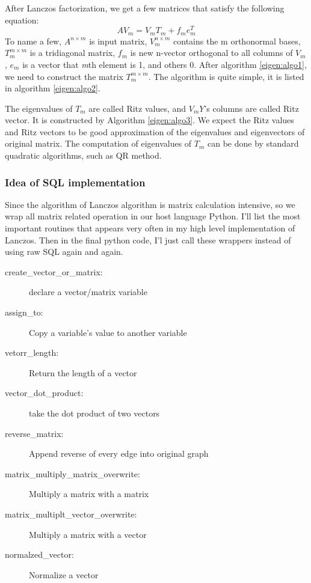 After Lanczos factorization, we get a few matrices that satisfy the following equation:
\begin{equation}
	AV_{m} = V_{m}T_{m} + f_{m}e^{T}_{m}
\end{equation}
To name a few, $A^{n\times m}$ is input matrix, $V^{n\times m}_{m}$ contains the m orthonormal bases, $T^{m\times m}_{m}$ is a tridiagonal matrix, $f_{m}$ is new n-vector orthogonal to all columns of $V_{m}$, $
e_{m}$ is a vector that \emph{m}th element is 1, and others 0. After algorithm \ref{eigen:algo1}, we need to construct the matrix $T^{m\times m}_{m}$. The algorithm is quite simple, it is listed in algorithm \ref{eigen:algo2}. 

The eigenvalues of $T_{m}$ are called Ritz values, and $V_{m}Y$'s columns are called Ritz vector. It is constructed by Algorithm \ref{eigen:algo3}. We expect the Ritz values and Ritz vectors to be good approximation of the eigenvalues and eigenvectors of original matrix. The computation of eigenvalues of $T_{m}$ can be done by standard quadratic algorithms, such as QR method. 


\subsubsection{Idea of SQL implementation}
Since the algorithm of Lanczos algorithm is matrix calculation intensive, so we wrap all matrix related operation in our host language Python. I'll list the most important routines that appears very often in my high level implementation of Lanczos. Then in the final python code, I'l just call these wrappers instead of using raw SQL again and again.
\begin{description}
  \item[create\_vector\_or\_matrix:]{declare a vector/matrix variable}
  \item[assign\_to:]{Copy a variable's value to another variable}
  \item[vetorr\_length:]{Return the length of a vector}
  \item[vector\_dot\_product:]{take the dot product of two vectors}
  \item[reverse\_matrix:]{Append reverse of every edge into original graph}
  \item[matrix\_multiply\_matrix\_overwrite:]{Multiply a matrix with a matrix}
  \item[matrix\_multiplt\_vector\_overwrite:]{Multiply a matrix with a vector}
  \item[normalzed\_vector:]{Normalize a vector}
\end{description}

